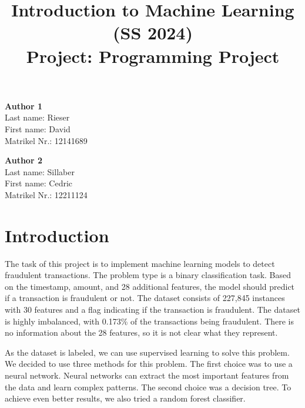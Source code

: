 \documentclass[a4paper, 10pt, conference]{ieeeconf}      %
\title{\LARGE \bf
Introduction to Machine Learning (SS 2024)\\ Project: Programming Project
\vspace{-3em}
}
\begin{document}
\maketitle
\vspace{-3em}
\thispagestyle{empty}
\pagestyle{empty}

\begin{strip}
\begin{tcolorbox}[
size=tight,
colback=white,
boxrule=0.2mm,
left=3mm,right=3mm, top=3mm, bottom=1mm
]
{\begin{multicols}{2}%

\textbf{Author 1}\\
Last name: Rieser\\
First name: David\\
Matrikel Nr.: 12141689\\

\columnbreak

\textbf{Author 2}\\
Last name: Sillaber\\
First name: Cedric\\ 
Matrikel Nr.: 12211124\\ 

\columnbreak

\end{multicols}}
\end{tcolorbox}
\end{strip}


\section{Introduction}
\label{sec:intro}
The task of this project is to implement machine learning models to detect fraudulent transactions. 
The problem type is a binary classification task. Based on the timestamp, amount, and 28 additional features, the model should predict if a transaction is fraudulent or not. 
The dataset consists of 227,845 instances with 30 features and a flag indicating if the transaction is fraudulent. The dataset is highly imbalanced, with 0.173\% of the transactions being fraudulent. There is no information about the 28 features, so it is not clear what they represent. 

As the dataset is labeled, we can use supervised learning to solve this problem. We decided to use three methods for this problem. 
The first choice was to use a neural network. Neural networks can extract the most important features from the data and learn complex patterns. 
The second choice was a decision tree. To achieve even better results, we also tried a random forest classifier.
\end{document}
